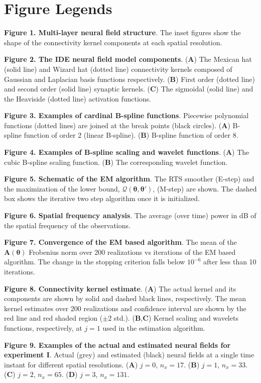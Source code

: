 \documentclass[review,authoryear,3p]{elsarticle}
\begin{document}
\section*{Figure Legends}
{\bf Figure 1. Multi-layer neural field structure}. The inset figures show the shape of the
connectivity kernel components at each spatial resolution.

{\bf Figure 2. The IDE neural field model components}. (\textbf{A}) The Mexican hat (solid line) and Wizard hat (dotted line) connectivity kernels composed of Gaussian and Laplacian basis functions respectively. (\textbf{B}) First order (dotted line) and second order (solid line) synaptic kernels. (\textbf{C}) The sigmoidal (solid line) and the Heaviside (dotted line) activation functions.   

{\bf Figure 3. Examples of cardinal B-spline functions}. Piecewise polynomial functions (dotted lines) are joined at the break points (black circles). (\textbf{A}) B-spline function of order 2 (linear B-spline). (\textbf{B}) B-spline function of order 8.

{\bf Figure 4. Examples of B-spline scaling and wavelet functions}. (\textbf{A}) The cubic B-spline scaling function. (\textbf{B}) The corresponding wavelet function.

{\bf Figure 5. Schematic of the EM algorithm}. The RTS smoother (E-step) and the maximization of the lower bound, $\mathcal Q(\boldsymbol \theta,\boldsymbol\theta')$, (M-step) are shown. The dashed box shows the iterative two step algorithm once it is initialized.

{\bf Figure 6. Spatial frequency analysis}. The average (over time) power in dB of the spatial frequency of the observations. 

{\bf Figure 7. Convergence of the EM based algorithm}. The mean  of the $\mathbf A(\boldsymbol\theta)$ Frobenius norm over 200 realizations vs iterations of the EM based algorithm. The change in the stopping criterion falls below $10^{-6}$ after less than 10 iterations.  

{\bf Figure 8. Connectivity kernel estimate}. (\textbf{A}) The actual kernel and its components are shown by solid and dashed black lines, respectively. The mean kernel estimates over 200 realizations and confidence interval are shown by the red line and red shaded region ($\pm2$ std.). (\textbf{B},\textbf{C}) Kernel scaling and wavelets functions, respectively, at $j=1$ used in the estimation algorithm. 

{\bf Figure 9. Examples of the actual and estimated neural fields for experiment I}. Actual (grey) and estimated (black) neural fields at a single time instant for different spatial resolutions. (\textbf{A}) $j=0$, $n_x=17$. (\textbf{B}) $j=1$, $n_x=33$. (\textbf{C}) $j=2$, $n_x=65$. (\textbf{D}) $j=3$, $n_x=131$.
\end{document}
